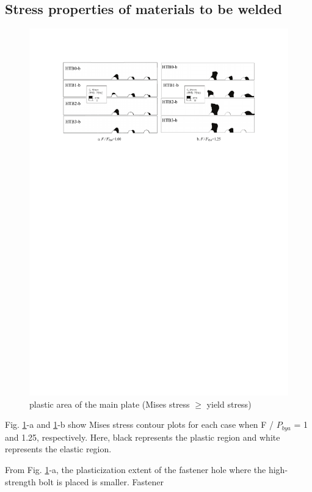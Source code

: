 \subsection{Stress properties of materials to be welded}

\begin{figure}[htbp]
    \centering
    \includegraphics[width=\textwidth]{imgs/ch4/fig21.pdf}
    \caption{plastic area of the main plate (Mises stress $\geq$ yield stress)}
    \label{ch4fig21}
\end{figure}

Fig. \ref{ch4fig21}-a and \ref{ch4fig21}-b show Mises stress contour plots for each case when F / $P_{bya}$  = 1 and 1.25, respectively. Here, black represents the plastic region and white represents the elastic region.

From Fig. \ref{ch4fig21}-a, the plasticization extent of the fastener hole where the high-strength bolt is placed is smaller. Fastener

